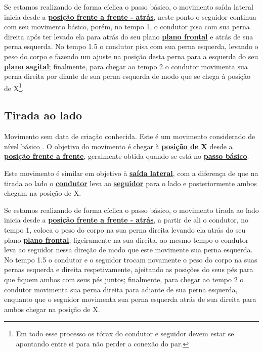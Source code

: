Se estamos realizando de forma cíclica o passo básico, o movimento saída lateral 
inicia desde a \hyperref[def:ffa-position]{\textbf{posição frente a frente - atrás}},
neste ponto o seguidor continua com seu movimento básico, porém, no tempo 1, 
o condutor pisa com sua perna direita após ter levado ela para atrás do seu plano 
\hyperref[def:PlanoFrontal]{\textbf{plano frontal}} e atrás de sua perna esquerda.
No tempo 1.5 o condutor pisa com sua perna esquerda, levando o peso do corpo e fazendo um ajuste na posição 
desta perna para a esquerda do seu \hyperref[def:PlanoSagital]{\textbf{plano sagital}};
finalmente, para chegar ao tempo 2 o condutor movimenta sua perna direita 
por diante de sua perna esquerda de modo que se chega à 
posição de X\footnote{\label{ref:saidalateral}Em todo esse processo os tórax do condutor 
e seguidor devem estar se apontando entre si para não perder a conexão do par.}.
 
 
\subsection{Tirada ao lado}
\label{subsec:tiradaaolado}

Movimento sem data de criação conhecida.
Este é um movimento considerado de nível básico \cite[pp. 144]{perna2002samba}.
O objetivo do movimento é chegar à \hyperref[def:X-position]{\textbf{posição de X}} 
desde a \hyperref[def:frente-frente-position]{\textbf{posição frente a frente}}, 
geralmente obtida quando se está no \hyperref[subsec:passobasico]{\textbf{passo básico}}. 

Este movimento é similar em objetivo à \hyperref[subsec:saidalateral]{\textbf{saída lateral}},
com a diferença de que na tirada ao lado o \hyperref[def:Condutor]{\textbf{condutor}} 
leva ao \hyperref[def:Seguidor]{\textbf{seguidor}} para o lado e posteriormente ambos
chegam na posição de X.


Se estamos realizando de forma cíclica o passo básico, o movimento tirada ao lado
inicia desde a \hyperref[def:ffa-position]{\textbf{posição frente a frente - atrás}},
a partir de ali o condutor, no tempo 1, 
coloca o peso do corpo na sua perna direita levando ela atrás do seu plano 
\hyperref[def:PlanoFrontal]{\textbf{plano frontal}}, ligeiramente na sua direita,
ao mesmo tempo o condutor leva ao seguidor nessa direção de modo que este movimente sua perna esquerda.
No tempo 1.5 o condutor e o seguidor trocam novamente o peso do corpo na suas pernas esquerda e direita respetivamente, 
ajeitando as posições do seus pés para que fiquem ambos com seus pés juntos;
finalmente, para chegar ao tempo 2 o condutor movimenta sua perna direita para adiante de sua perna esquerda,
enquanto que o seguidor movimenta sua perna esquerda atrás de sua direita para 
ambos chegar na posição de X.
 
